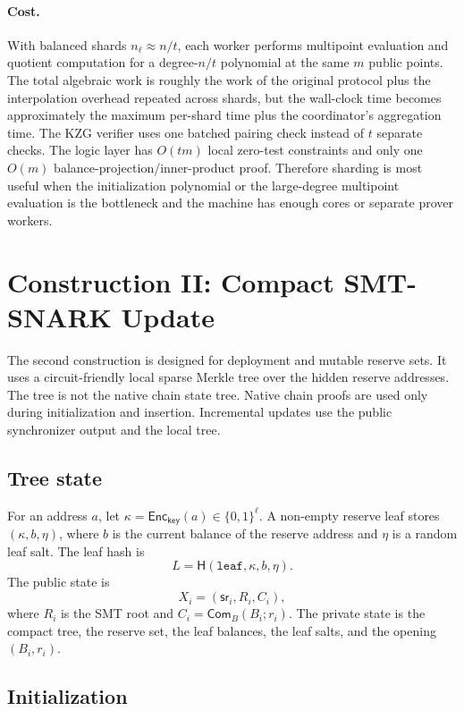 \documentclass[runningheads]{llncs}
\newcommand{\bits}{\{0,1\}}
\newcommand{\Enc}{\mathsf{Enc}}
\newcommand{\Com}{\mathsf{Com}}
\newcommand{\CRH}{\mathsf{H}}
\newcommand{\sr}{\mathsf{sr}}
\begin{document}
\paragraph{Cost.}
With balanced shards \(n_\ell\approx n/t\), each worker performs multipoint evaluation and quotient computation for a degree-\(n/t\) polynomial at the same \(m\) public points.  The total algebraic work is roughly the work of the original protocol plus the interpolation overhead repeated across shards, but the wall-clock time becomes approximately the maximum per-shard time plus the coordinator's aggregation time.  The KZG verifier uses one batched pairing check instead of \(t\) separate checks.  The logic layer has \(O(tm)\) local zero-test constraints and only one \(O(m)\) balance-projection/inner-product proof.  Therefore sharding is most useful when the initialization polynomial or the large-degree multipoint evaluation is the bottleneck and the machine has enough cores or separate prover workers.

\section{Construction II: Compact SMT-SNARK Update}\label{sec:smt}

The second construction is designed for deployment and mutable reserve sets.  It uses a circuit-friendly local sparse Merkle tree over the hidden reserve addresses.  The tree is not the native chain state tree.  Native chain proofs are used only during initialization and insertion.  Incremental updates use the public synchronizer output and the local tree.

\subsection{Tree state}

For an address \(a\), let \(\kappa=\Enc_{\mathsf{key}}(a)\in\bits^\ell\).  A non-empty reserve leaf stores \((\kappa,b,\eta)\), where \(b\) is the current balance of the reserve address and \(\eta\) is a random leaf salt.  The leaf hash is
\[
        L=\CRH(\mathtt{leaf},\kappa,b,\eta).
\]
The public state is
\[
        X_i=(\sr_i,R_i,C_i),
\]
where \(R_i\) is the SMT root and \(C_i=\Com_B(B_i;r_i)\).  The private state is the compact tree, the reserve set, the leaf balances, the leaf salts, and the opening \((B_i,r_i)\).

\subsection{Initialization}
\end{document}
